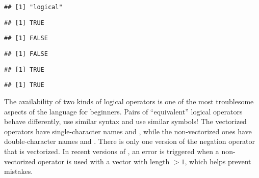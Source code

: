 \documentclass[krantz2]{krantz}\usepackage{knitr}
\begin{document}
\begin{knitrout}\footnotesize
{}\color{fgcolor}\begin{kframe}
\begin{alltt}
 \hlkwb{<-} 
 \hlkwb{<-} 
\end{alltt}
\begin{verbatim}
## [1] "logical"
\end{verbatim}
\begin{alltt}
\end{alltt}
\begin{verbatim}
## [1] TRUE
\end{verbatim}
\begin{alltt}
\hlopt{!} 
\end{alltt}
\begin{verbatim}
## [1] FALSE
\end{verbatim}
\begin{alltt}
 \hlopt{&&}  
\end{alltt}
\begin{verbatim}
## [1] FALSE
\end{verbatim}
\begin{alltt}
 \hlopt{||}  
\end{alltt}
\begin{verbatim}
## [1] TRUE
\end{verbatim}
\begin{alltt}
 
\end{alltt}
\begin{verbatim}
## [1] TRUE
\end{verbatim}
\end{kframe}
\end{knitrout}

The availability of two kinds of logical operators is one of the most troublesome aspects of the \Rlang language for beginners. Pairs of ``equivalent'' logical operators behave differently, use similar syntax and use similar symbols! The vectorized operators have single-character names \Roperator{\&} and \Roperator{\textbar}, while the non-vectorized ones have double-character names \Roperator{\&\&} and \Roperator{\textbar\textbar}. There is only one version of the negation operator \Roperator{!} that is vectorized. In recent versions of \Rlang, an error is triggered when a non-vectorized operator is used with a vector with length $> 1$, which helps prevent mistakes.
\end{document}
